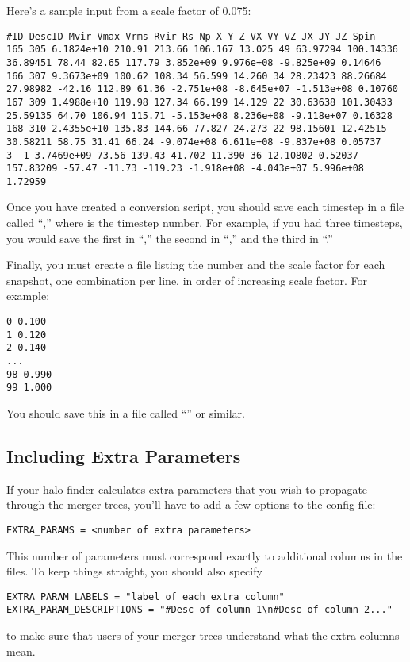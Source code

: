 \documentclass[12pt]{article}
\begin{document}
      Here's a sample input from a scale factor of 0.075:
\tiny
\begin{verbatim}
#ID DescID Mvir Vmax Vrms Rvir Rs Np X Y Z VX VY VZ JX JY JZ Spin
165 305 6.1824e+10 210.91 213.66 106.167 13.025 49 63.97294 100.14336 36.89451 78.44 82.65 117.79 3.852e+09 9.976e+08 -9.825e+09 0.14646
166 307 9.3673e+09 100.62 108.34 56.599 14.260 34 28.23423 88.26684 27.98982 -42.16 112.89 61.36 -2.751e+08 -8.645e+07 -1.513e+08 0.10760
167 309 1.4988e+10 119.98 127.34 66.199 14.129 22 30.63638 101.30433 25.59135 64.70 106.94 115.71 -5.153e+08 8.236e+08 -9.118e+07 0.16328
168 310 2.4355e+10 135.83 144.66 77.827 24.273 22 98.15601 12.42515 30.58211 58.75 31.41 66.24 -9.074e+08 6.611e+08 -9.837e+08 0.05737
3 -1 3.7469e+09 73.56 139.43 41.702 11.390 36 12.10802 0.52037 157.83209 -57.47 -11.73 -119.23 -1.918e+08 -4.043e+07 5.996e+08 1.72959
\end{verbatim}
\normalsize
	Once you have created a conversion script, you should save each timestep
      in a file called ``,'' where  is the timestep number.
      For example, if you had three timesteps, you would save the first in
      ``,'' the second in ``,'' and the third in ``.''

      Finally, you must create a file listing the number and the scale factor
      for each snapshot, one combination per line, in order of increasing
      scale factor.  For example:
\begin{verbatim}
0 0.100
1 0.120
2 0.140
...
98 0.990
99 1.000
\end{verbatim}
      You should save this in a file called ``'' or similar.

\subsection{Including Extra Parameters}
      If your halo finder calculates extra parameters that you wish to propagate through the
      merger trees, you'll have to add a few options to the config file:
\begin{verbatim}
EXTRA_PARAMS = <number of extra parameters>
\end{verbatim}
      This number of parameters must correspond exactly to additional
      columns in the  files.  To keep things straight, you should
      also specify
\begin{verbatim}
EXTRA_PARAM_LABELS = "label of each extra column"
EXTRA_PARAM_DESCRIPTIONS = "#Desc of column 1\n#Desc of column 2..."
\end{verbatim}
      to make sure that users of your merger trees understand what the
      extra columns mean.
\end{document}
